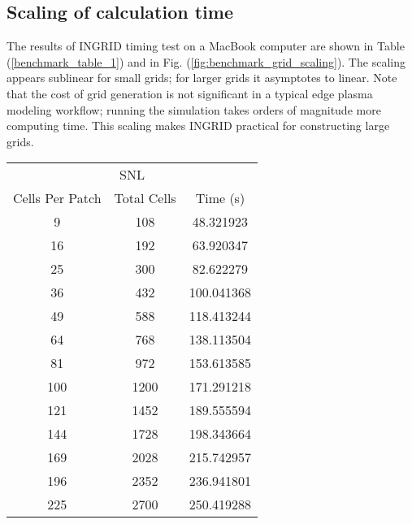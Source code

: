 \subsection{Scaling of calculation time}

The results of INGRID timing test on a MacBook computer are shown in
Table (\ref{benchmark_table_1}) and in
Fig. (\ref{fig:benchmark_grid_scaling}). The scaling appears sublinear
for small grids; for larger grids it asymptotes to linear. Note that
the cost of grid generation is not significant in a typical edge
plasma modeling workflow; running the simulation takes orders of
magnitude more computing time. This scaling makes INGRID practical for constructing large grids.\\

\begin{tabular}{|c|c|c|}
    \toprule
    \multicolumn{3}{|c|}{SNL}\\
    \cline{1-3}
    {Cells Per Patch} & Total Cells &    Time (s) \\
    \midrule
    9  &       108 &   48.321923 \\
    16  &       192 &   63.920347 \\
    25  &       300 &   82.622279 \\
    36  &       432 &  100.041368 \\
    49  &       588 &  118.413244 \\
    64  &       768 &  138.113504 \\
    81  &       972 &  153.613585 \\
    100  &      1200 &  171.291218 \\
    121  &      1452 &  189.555594 \\
    144  &      1728 &  198.343664 \\
    169 &      2028 &  215.742957 \\
    196 &      2352 &  236.941801 \\
    225 &      2700 &  250.419288 \\
    \bottomrule
\end{tabular}

